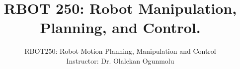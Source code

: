 \documentclass[doublespacing]{brandeis}
\author{RBOT250: Robot Motion Planning, Manipulation and Control \\
	Instructor: Dr. Olalekan Ogunmolu}
\title{RBOT 250: Robot Manipulation, Planning, and Control.
}
\numberwithin{equation}{section}
\theoremstyle{definition}
\begin{document}
	
	\frontmatter
	
	
	\tableofcontents
	\listoffigures %
	\listoftables %
	
	\mainmatter
%



\newpage




%



%
\providecommand\BIBentryALTinterwordstretchfactor{2.5}

%

\end{document}
